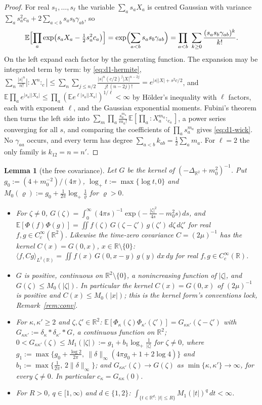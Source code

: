 \documentclass[11pt,a4paper]{article}
\theoremstyle{plain}
\theoremstyle{definition}
\theoremstyle{plain}
\newtheorem{auxlemma}{Lemma}
\theoremstyle{definition}
\newcommand{\R}{\mathbb{R}}
\newcommand{\E}{\mathbb{E}}
\newcommand{\ip}[2]{\langle #1,#2\rangle}
\begin{document}
\begin{proof}
For real $s_1,\dots,s_\ell$ the variable $\sum_as_aX_a$ is centred Gaussian with variance
$\sum_as_a^2c_a+2\sum_{a<b}s_as_b\gamma_{ab}$, so
\[
 \E\Bigl[\prod_a\exp\bigl(s_aX_a-\tfrac12s_a^2c_a\bigr)\Bigr]
 =\exp\Bigl(\sum_{a<b}s_as_b\gamma_{ab}\Bigr)
 =\prod_{a<b}\ \sum_{k\ge0}\frac{(s_as_b\gamma_{ab})^k}{k!} .
\]
On the left expand each factor by the generating function. The expansion may be integrated
term by term: by \eqref{eq:d1-hermite},
$\sum_n\frac{|s|^n}{n!}|{:}X^n{:}_c|
\le\sum_n\sum_{j\le n/2}\frac{|s|^n(c/2)^j|X|^{n-2j}}{j!\,(n-2j)!}=e^{|s||X|+s^2c/2}$, and
$\E\prod_ae^{|s_a||X_a|}\le\prod_a(\E e^{\ell|s_a||X_a|})^{1/\ell}<\infty$ by H\"older's
inequality with $\ell$ factors, each with exponent $\ell$, and the Gaussian exponential
moments. Fubini's theorem then turns the left side into
$\sum_m\prod_a\frac{s_a^{m_a}}{m_a!}\,\E[\prod_a{:}X_a^{m_a}{:}_{c_a}]$, a power series
converging for all $s$, and comparing the coefficients of $\prod_as_a^{m_a}$ gives
\eqref{eq:d1-wick}. No $\gamma_{aa}$ occurs, and every term has degree
$\sum_{a<b}k_{ab}=\frac12\sum_am_a$. For $\ell=2$ the only family is $k_{12}=n=n'$.
\end{proof}

\begin{auxlemma}[the free covariance]\label{aux:d1-cov}
Let $G$ be the kernel of $(-\Delta_{\R^2}+m_0^2)^{-1}$. Put $g_0:=(4+m_0^{-2})/(4\pi)$,
$\log_+t:=\max\{\log t,0\}$ and $M_0(\varrho):=g_0+\frac1{2\pi}\log_+\frac1\varrho$ for
$\varrho>0$.
\begin{itemize}
\item[(i)] For $\zeta\ne0$,
$G(\zeta)=\int_0^\infty(4\pi s)^{-1}\exp\bigl(-\frac{|\zeta|^2}{4s}-m_0^2s\bigr)\,ds$, and
$\E[\Phi(f)\Phi(g)]=\iint f(\zeta)\,G(\zeta-\zeta')\,g(\zeta')\,d\zeta\,d\zeta'$ for real
$f,g\in C_c^\infty(\R^2)$. Likewise the time-zero covariance $C=(2\mu)^{-1}$
has the kernel $C(x)=G(0,x)$, $x\in\R\setminus\{0\}$:
$\ip{f}{Cg}_{L^2(\R)}=\iint f(x)\,G(0,x-y)\,g(y)\,dx\,dy$ for real $f,g\in C_c^\infty(\R)$.
\item[(ii)] $G$ is positive, continuous on $\R^2\setminus\{0\}$, a nonincreasing function of
$|\zeta|$, and $G(\zeta)\le M_0(|\zeta|)$. In particular the kernel $C(x)=G(0,x)$ of
$(2\mu)^{-1}$ is positive and $C(x)\le M_0(|x|)$; this is the kernel form's
conventions lock, Remark~\ref{rem:conv}.
\item[(iii)] For $\kappa,\kappa'\ge2$ and $\zeta,\zeta'\in\R^2$:
$\E[\Phi_\kappa(\zeta)\Phi_{\kappa'}(\zeta')]=G_{\kappa\kappa'}(\zeta-\zeta')$ with
$G_{\kappa\kappa'}:=\delta_\kappa*\delta_{\kappa'}*G$, a continuous function on $\R^2$;
$0<G_{\kappa\kappa'}(\zeta)\le M_1(|\zeta|):=g_1+b_1\log_+\frac1{|\zeta|}$ for $\zeta\ne0$,
where
$g_1:=\max\bigl\{g_0+\frac{\log2}{2\pi},\ \|\delta\|_\infty(4\pi g_0+1+2\log4)\bigr\}$ and
$b_1:=\max\{\frac1{2\pi},\,2\|\delta\|_\infty\}$; and
$G_{\kappa\kappa'}(\zeta)\to G(\zeta)$ as $\min\{\kappa,\kappa'\}\to\infty$, for every
$\zeta\ne0$. In particular $c_\kappa=G_{\kappa\kappa}(0)$.
\item[(iv)] For $R>0$, $q\in[1,\infty)$ and $d\in\{1,2\}$:
$\int_{\{t\in\R^d:\,|t|\le R\}}M_1(|t|)^q\,dt<\infty$.
\end{itemize}
\end{auxlemma}
\end{document}
